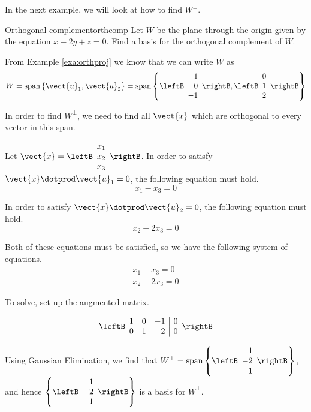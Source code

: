 In the next example, we will look at how to find
$W^{\perp}$.

\begin{example}{Orthogonal complement}{orthcomp}
Let $W$ be the  plane through the origin given by the equation  $x - 2y + z = 0$. Find
a basis for the orthogonal complement of $W$.
\end{example}

\begin{solution}

From Example \ref{exa:orthproj} we know that we can write $W$ as 
\[
W = \mbox{span} \left\{ \vect{u}_1, \vect{u}_2 \right\} = \mbox{span} 
\left\{
\leftB
\begin{array}{r}
1 \\
0 \\
-1
\end{array}
\rightB,
\leftB
\begin{array}{c}
0 \\
1 \\
2
\end{array}
\rightB
\right\}
\]

In order to find $W^{\perp}$, we need to find all $\vect{x}$ which are orthogonal to every vector in this span. 

Let $\vect{x} = \leftB
\begin{array}{c}
x_1 \\
x_2 \\
x_3
\end{array}
\rightB$. 
In order to satisfy $\vect{x} \dotprod \vect{u}_1 = 0$, the following equation must hold. 
\[
x_1 - x_3 = 0
\]

In order to satisfy $\vect{x} \dotprod \vect{u}_2 = 0$, the following equation must hold.
\[
x_2 + 2x_3 = 0 
\]

Both of these equations must be satisfied, so we have the following system of equations. 
\[
\begin{array}{c}
x_1 - x_3 = 0 \\
x_2 + 2x_3 = 0
\end{array}
\]

To solve, set up the augmented matrix. 

\[
\leftB \begin{array}{rrr|r}
1 & 0 & -1 & 0 \\
0 & 1 & 2 & 0 
\end{array} \rightB
\]

Using Gaussian Elimination, we find that $W^{\perp} = \mbox{span} \left\{ \leftB
\begin{array}{r}
1 \\
-2 \\
1
\end{array}
\rightB
\right\}$, and hence 
$\left\{ \leftB
\begin{array}{r}
1 \\
-2 \\
1
\end{array}
\rightB
\right\}$ is a basis for  $W^{\perp}$. 
\end{solution}

